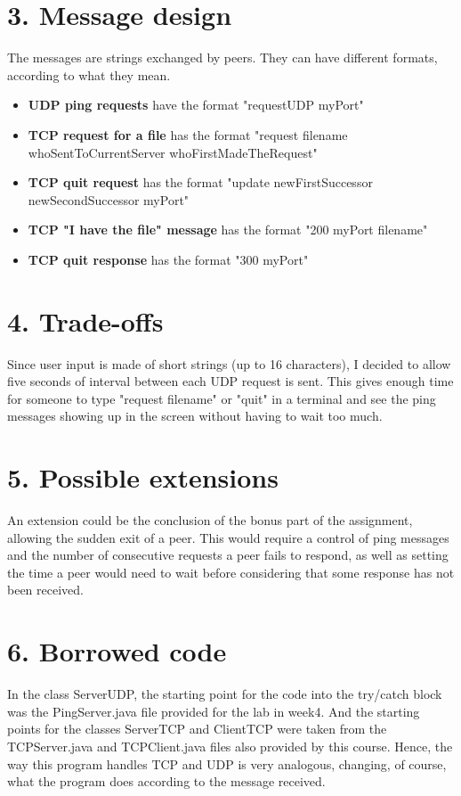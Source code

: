 \documentclass[a4paper,11pt]{report}
\begin{document}
\section*{3. Message design}
        The messages are strings exchanged by peers. They can have different formats, according to what they mean.
        
        \begin{itemize}
                \item \textbf{UDP ping requests} have the format "requestUDP myPort"
                \item \textbf{TCP request for a file} has the format "request filename whoSentToCurrentServer whoFirstMadeTheRequest"
                \item \textbf{TCP quit request} has the format "update newFirstSuccessor newSecondSuccessor myPort"
                \item \textbf{TCP "I have the file" message} has the format "200 myPort filename"
                \item \textbf{TCP quit response} has the format "300 myPort"
        \end{itemize}

\section*{4. Trade-offs}
        Since user input is made of short strings (up to 16 characters), I decided to allow five seconds of interval between each UDP request is sent. This gives enough time for someone to type "request filename" or "quit" in a terminal and see the ping messages showing up in the screen without having to wait too much.

\section*{5. Possible extensions}
        An extension could be the conclusion of the bonus part of the assignment, allowing the sudden exit of a peer. This would require a control of ping messages and the number of consecutive requests a peer fails to respond, as well as setting the time a peer would need to wait before considering that some response has not been received.

\section*{6. Borrowed code}
        In the class ServerUDP, the starting point for the code into the try/catch block was the PingServer.java file provided for the lab in week4. And the starting points for the classes ServerTCP and ClientTCP were taken from the TCPServer.java and TCPClient.java files also provided by this course. Hence, the way this program handles TCP and UDP is very analogous, changing, of course, what the program does according to the message received.
        
\end{document}
